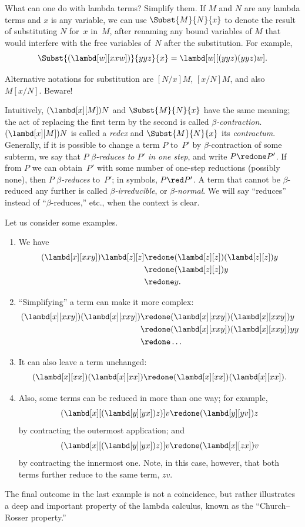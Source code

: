 \documentclass[../../../include/open-logic-section]{subfiles}
\begin{document}

What can one do with lambda terms? Simplify them. If $M$ and $N$ are
any lambda terms and $x$ is any variable, we can use $\Subst{M}{N}{x}$ to
denote the result of substituting $N$ for~$x$ in~$M$, after renaming
any bound variables of $M$ that would interfere with the free
variables of~$N$ after the substitution. For example,
\[
\Subst{(\lambd[w][xxw])}{yyz}{x} = \lambd[w][(yyz)(yyz)w].
\]

\begin{digress}
Alternative notations for substitution are $[N/x]M$, $[x/N]M$, and
also $M[x/N]$. Beware!
\end{digress}

Intuitively, $(\lambd[x][M])N$ and $\Subst{M}{N}{x}$ have the same
meaning; the act of replacing the first term by the second is called
\emph{$\beta$-contraction}. $(\lambd[x][M])N$ is called a \emph{redex}
and $\Subst{M}{N}{x}$ its \emph{contractum}. Generally, if it is
possible to change a term $P$ to~$P'$ by $\beta$-contraction of some
subterm, we say that $P$ \emph{$\beta$-reduces to $P'$ in one step},
and write $P \redone P'$. If from $P$ we can obtain~$P'$ with some
number of one-step reductions (possibly none), then $P$
\emph{$\beta$-reduces} to~$P'$; in symbols, $P \red P'$. A term that
cannot be $\beta$-reduced any further is called
\emph{$\beta$-irreducible}, or \emph{$\beta$-normal}. We will say
``reduces'' instead of ``$\beta$-reduces,'' etc., when the context is
clear.

Let us consider some examples.
\begin{enumerate}
\item We have
\begin{align*}
(\lambd[x][xxy]) \lambd[z][z] & \redone (\lambd[z][z])(\lambd[z][z]) y \\
& \redone (\lambd[z][z]) y \\
& \redone y.
\end{align*}
\item ``Simplifying'' a term can make it more complex:
\begin{align*}
(\lambd[x][xxy])(\lambd[x][xxy]) & \redone (\lambd[x][xxy])(\lambd[x][xxy])y \\
& \redone (\lambd[x][xxy])(\lambd[x][xxy])yy \\
& \redone \dots
\end{align*}
\item It can also leave a term unchanged:
\[
(\lambd[x][xx])(\lambd[x][xx]) \redone (\lambd[x][xx])(\lambd[x][xx]).
\]
\item Also, some terms can be reduced in more than one way; for
  example,
\[
(\lambd[x][(\lambd[y][yx]) z)] v \redone (\lambd[y][yv]) z
\]
by contracting the outermost application; and
\[
(\lambd[x][(\lambd[y][yx]) z)] v \redone (\lambd[x][zx]) v
\]
by contracting the innermost one. Note, in this case, however, that
both terms further reduce to the same term, $zv$.
\end{enumerate}

The final outcome in the last example is not a coincidence, but rather
illustrates a deep and important property of the lambda calculus, known as the
``Church--Rosser property.''
\end{document}
